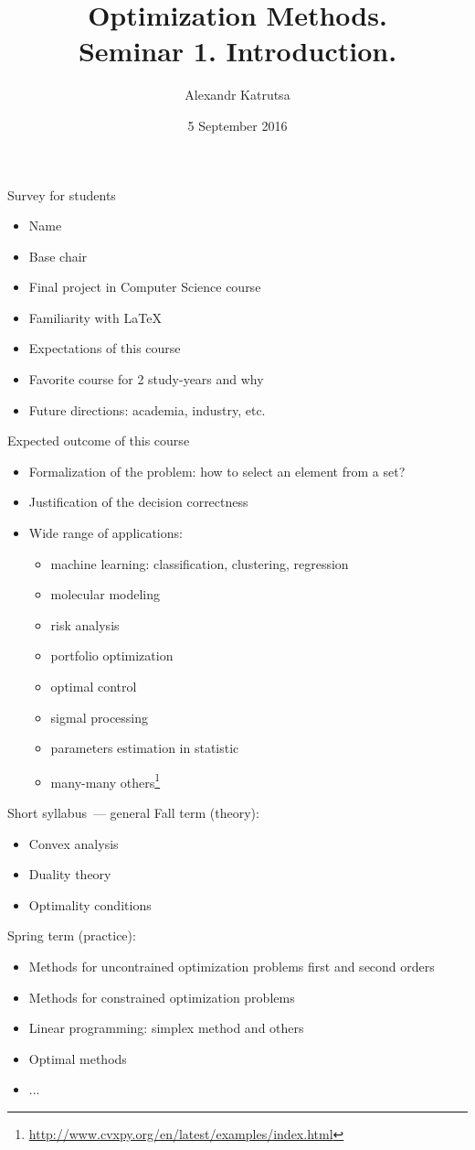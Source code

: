 \documentclass[12pt]{beamer}
\title[Seminar 1]{Optimization Methods. \\
Seminar 1. Introduction.}
\author{Alexandr Katrutsa}
\institute{Moscow Institute of Physics and Technology\\
Department of Control and Applied Mathematics}
\date{5 September 2016}
\begin{document}
\begin{frame}
\titlepage
\end{frame}

\begin{frame}{Survey for students}
\begin{itemize}
\item Name
\item Base chair
\item Final project in Computer Science course
\item Familiarity with \LaTeX
\item Expectations of this course
\item Favorite course for 2 study-years and why
\item Future directions: academia, industry, etc.
\end{itemize}

\end{frame}

\begin{frame}{Expected outcome of this course}
\begin{itemize}
\item Formalization of the problem: how to select an element from a set?
\item Justification of the decision correctness
\item Wide range of applications:
\begin{itemize}
\item machine learning: classification, clustering, regression
\item molecular modeling
\item risk analysis
\item portfolio optimization
\item optimal control
\item sigmal processing
\item parameters estimation in statistic
\item many-many others\footnote{\url{http://www.cvxpy.org/en/latest/examples/index.html}}
\end{itemize}
\end{itemize}
\end{frame}

\begin{frame}{Short syllabus~--- general}
Fall term (theory):
\begin{itemize}
\item Convex analysis
\item Duality theory
\item Optimality conditions
\end{itemize}

Spring term (practice):
\begin{itemize}
\item Methods for uncontrained optimization problems first and second orders
\item Methods for constrained optimization problems
\item Linear programming: simplex method and others
\item Optimal methods
\item ...
\end{itemize}
\end{frame}
\end{document}
